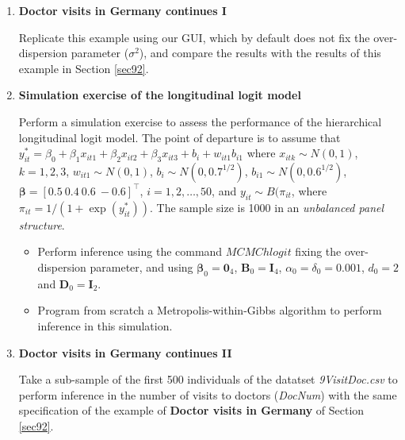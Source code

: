 \begin{enumerate}
\item \textbf{Doctor visits in Germany continues I}

Replicate this example using our GUI, which by default does not fix the over-dispersion parameter ($\sigma^2$), and compare the results with the results of this example in Section \ref{sec92}.

\item \textbf{Simulation exercise of the longitudinal logit model}

Perform a simulation exercise to assess the performance of the hierarchical longitudinal logit model. The point of departure is to assume that $y_{it}^*=\beta_0+\beta_1x_{it1}+\beta_2x_{it2}+\beta_3x_{it3}+b_i+w_{it1}b_{i1}$ where $x_{itk}\sim N(0,1)$, $k=1,2,3$, $w_{it1}\sim N(0,1)$, $b_i\sim N(0, 0.7^{1/2})$, $b_{i1}\sim N(0, 0.6^{1/2})$, $\bm{\beta}=[0.5 \ 0.4 \ 0.6 \ -0.6]^{\top}$, $i=1,2,\dots,50$, and $y_{it}\sim B(\pi_{it}$, where $\pi_{it}=1/(1+\exp(y_{it}^*))$. The sample size is 1000 in an \textit{unbalanced panel structure}.

\begin{itemize}
	\item Perform inference using the command $MCMChlogit$ fixing the over-dispersion parameter, and using $\bm{\beta}_0=\bm{0}_4$, $\bm{B}_0=\bm{I}_4$, $\alpha_0=\delta_0=0.001$, $d_0=2$ and $\bm{D}_0=\bm{I}_2$.
	\item Program from scratch a Metropolis-within-Gibbs algorithm to perform inference in this simulation.  
\end{itemize} 

\item \textbf{Doctor visits in Germany continues II} 

Take a sub-sample of the first 500 individuals of the datatset \textit{9VisitDoc.csv} to perform inference in the number of visits to doctors (\textit{DocNum}) with the same specification of the example of \textbf{Doctor visits in Germany} of Section \ref{sec92}.	
	
\end{enumerate}